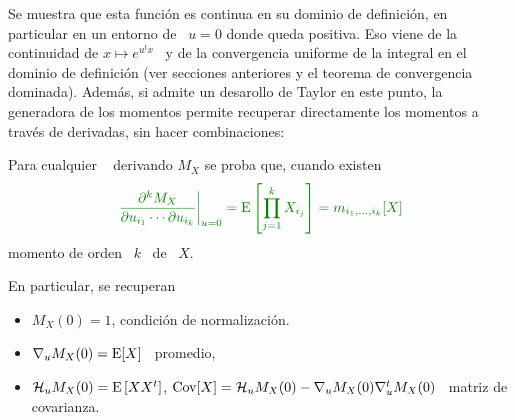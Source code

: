 Se muestra  que esta  funci\'on es  continua en su  dominio de  definici\'on, en
particular en  un entorno de  \ $u =  0$ donde queda  positiva. Eso viene  de la
continuidad  de $x \mapsto  e^{u^t x}$  \ y  de la  convergencia uniforme  de la
integral en el dominio de definici\'on (ver secciones anteriores y el teorema de
convergencia  dominada). Adem\'as,  si admite  un  desarollo de  Taylor en  este
punto, la generadora de los momentos permite recuperar directamente los momentos
a trav\'es de derivadas, sin hacer combinaciones:
%
\begin{lema}
\label{Lem:MP:GeneracionMomentos}
%
  Para cualquier \  
  derivando $M_X$ se proba que, cuando existen
  \[
  \modif{\left.\frac{\partial^k     M_X}{\partial     u_{i_1}     \cdots     \partial
      u_{i_k}}\right|_{u=0}  = \Esp\left[  \prod_{j=1}^k  X_{i_j} \right]  =
  m_{i_1,\ldots,i_k}[X]}
  \]
  momento de orden \ $k$ \ de \ $X$.
\end{lema}
%
En particular, se recuperan
%
\begin{itemize}
\item $M_X(0) = 1$, condici\'on de normalizaci\'on.
%
\item $\nabla_u M_X(0) = \operatorname{E}[X]$ \ promedio,
%
\item $\mathcal{H}_u M_X(0) = \operatorname{E}\left[ X X^t \right]$, \ie $\operatorname{Cov}[X] = \mathcal{H}_u M_X(0)
  - \nabla_u M_X(0) \nabla_u^t M_X(0)$ \ matriz de covarianza.
\end{itemize}

